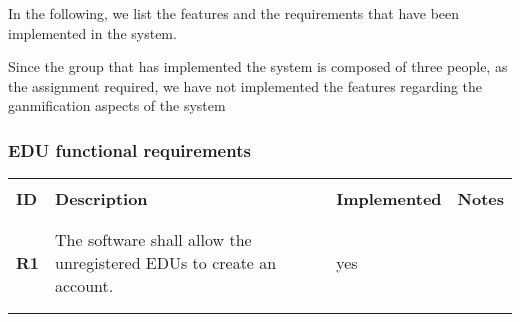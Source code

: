 In the following, we list the features and the requirements that have been implemented in the system.

Since the group that has implemented the system is composed of three people, as the assignment required, we have not implemented the features regarding the ganmification aspects of the system

\subsubsection*{EDU functional requirements}
\renewcommand{\arraystretch}{0.5}
\begin{longtable}[H]{l p{8cm} l p{2cm}}
    \hline
                 &                                                                                                                                                                                                                                                                          &                      &                                                                                         \\
    \textbf{ID}  & \textbf{Description}                                                                                                                                                                                                                                                     & \textbf{Implemented} & \textbf{Notes}                                                                          \\
                 &                                                                                                                                                                                                                                                                          &                      &                                                                                         \\\hline & & & \\
    \textbf{R1}  & The software shall allow the unregistered EDUs to create an account.                                                                                                                                                                                                     & {\color{green}yes}   &                                                                                         \\
                 &                                                                                                                                                                                                                                                                          &                      &                                                                                         \\\hline & & & \\

\end{longtable}
